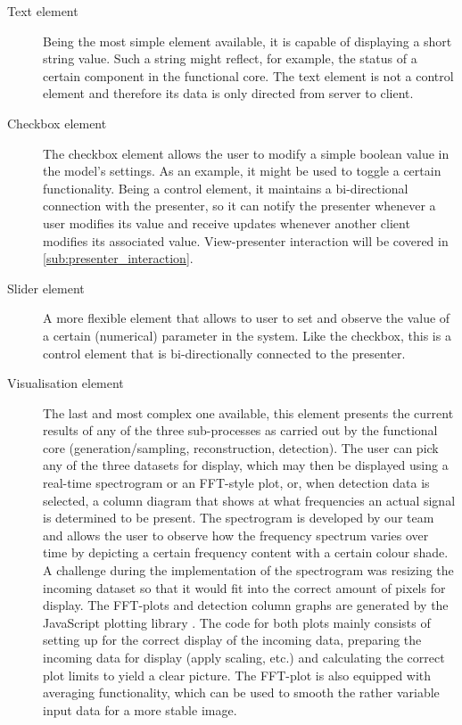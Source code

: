 \documentclass[a4paper, openany, oneside]{memoir}
\begin{document}
\begin{description}
	\item[Text element]
	Being the most simple element available, it is capable of displaying a short string value. Such a string might reflect, for example, the status of a certain component in the functional core. The text element is not a control element and therefore its data is only directed from server to client.

	\item[Checkbox element]
	The checkbox element allows the user to modify a simple boolean value in the model's settings. As an example, it might be used to toggle a certain functionality. Being a control element, it maintains a bi-directional connection with the presenter, so it can notify the presenter whenever a user modifies its value and receive updates whenever another client modifies its associated value. View-presenter interaction will be covered in \cref{sub:presenter_interaction}.

	\item[Slider element] 
	A more flexible element that allows to user to set and observe the value of a certain (numerical) parameter in the system. Like the checkbox, this is a control element that is bi-directionally connected to the presenter.

	\item[Visualisation element] 
	The last and most complex one available, this element presents the current results of any of the three sub-processes as carried out by the functional core (generation/sampling, reconstruction, detection). The user can pick any of the three datasets for display, which may then be displayed using a real-time spectrogram or an FFT-style plot, or, when detection data is selected, a column diagram that shows at what frequencies an actual signal is determined to be present.
	The spectrogram is developed by our team and allows the user to observe how the frequency spectrum varies over time by depicting a certain frequency content with a certain colour shade. A challenge during the implementation of the spectrogram was resizing the incoming dataset so that it would fit into the correct amount of pixels for display.
	The FFT-plots and detection column graphs are generated by the JavaScript plotting library . The code for both plots mainly consists of setting up  for the correct display of the incoming data, preparing the incoming data for display (apply scaling, etc.) and calculating the correct plot limits to yield a clear picture.
	The FFT-plot is also equipped with averaging functionality, which can be used to smooth the rather variable input data for a more stable image.
\end{description}
\end{document}

